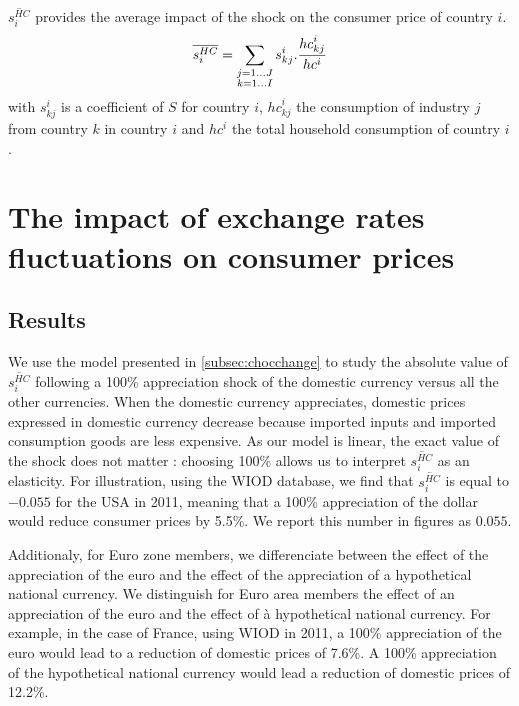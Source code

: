 \documentclass[11pt,a4paper]{article}
\begin{document}
$\overline{s_{i}^{HC}}$ provides the average impact of the shock on the consumer price of country $i$. 
 \begin{eqnarray}
\overline{s_{i}^{HC}}=\underset{\begin{subarray}{c}j=1\dots J \\ k=1 \dots I \end{subarray}}{\mathop \sum}\,{{s}_{kj}^i}.\frac{{hc}_{kj}^i}{hc^i}
\label{eq:eq6}
 \end{eqnarray} 
with ${s}_{kj}^i$ is a coefficient of $S$ for country $i$, ${hc}_{kj}^i$ the consumption of industry $j$ from country $k$ in country $i$ and $hc^i$ the total household consumption of country $i$. 

\section{The impact of exchange rates fluctuations on consumer prices}
\label{sec:prixconso}
\subsection{Results}
We use the model presented in \ref{subsec:chocchange} to study the absolute value of $\overline{s_{i}^{HC}}$ following a 100\% appreciation shock of the domestic currency versus all the other currencies. When the domestic currency appreciates, domestic prices expressed in domestic currency decrease because imported inputs and imported consumption goods are less expensive. As our model is linear, the exact value of the shock does not matter : choosing 100\% allows us to interpret  $\overline{s_{i}^{HC}}$ as an elasticity. For illustration, using the WIOD database, we find that $\overline{s_{i}^{HC}}$ is equal to $-0.055$ for the USA in 2011, meaning that a 100\% appreciation of the dollar would reduce consumer prices by 5.5\%. We report this number in figures as $0.055$.

Additionaly, for Euro zone members, we differenciate between the effect of the appreciation of the euro and the effect of the appreciation of a hypothetical national currency. We distinguish for Euro area members the effect of an appreciation of the euro and the effect of à hypothetical national currency. For example, in the case of France, using WIOD in 2011, a 100\% appreciation of the euro would lead to a reduction of domestic prices of 7.6\%. A 100\% appreciation of the hypothetical national currency would lead a reduction of domestic prices of 12.2\%. 
\end{document}

